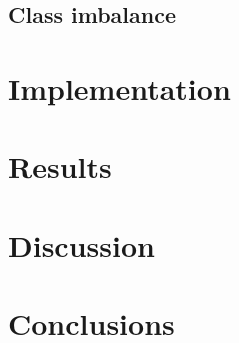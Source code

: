 \documentclass[conference]{IEEEtran}
\begin{document}
\subsection{Class imbalance}

\section{Implementation}

\section{Results}

\section{Discussion}

\section{Conclusions}
\end{document}
